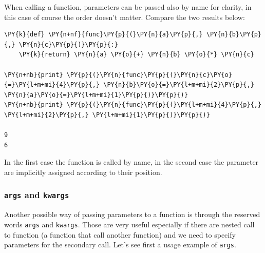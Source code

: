When calling a function, parameters can be passed also by name for clarity, in this case of 
course the order doesn't matter. Compare the two results below:

\begin{codebox}[breakable, size=fbox, boxrule=1pt, pad at break*=1mm,colback=cellbackground, colframe=cellborder]
\begin{Verbatim}[commandchars=\\\{\}]
\PY{k}{def} \PY{n+nf}{func}\PY{p}{(}\PY{n}{a}\PY{p}{,} \PY{n}{b}\PY{p}{,} \PY{n}{c}\PY{p}{)}\PY{p}{:}
    \PY{k}{return} \PY{n}{a} \PY{o}{+} \PY{n}{b} \PY{o}{*} \PY{n}{c}

\PY{n+nb}{print} \PY{p}{(}\PY{n}{func}\PY{p}{(}\PY{n}{c}\PY{o}{=}\PY{l+m+mi}{4}\PY{p}{,} \PY{n}{b}\PY{o}{=}\PY{l+m+mi}{2}\PY{p}{,} \PY{n}{a}\PY{o}{=}\PY{l+m+mi}{1}\PY{p}{)}\PY{p}{)}
\PY{n+nb}{print} \PY{p}{(}\PY{n}{func}\PY{p}{(}\PY{l+m+mi}{4}\PY{p}{,} \PY{l+m+mi}{2}\PY{p}{,} \PY{l+m+mi}{1}\PY{p}{)}\PY{p}{)}

9
6
\end{Verbatim}
\end{codebox}

In the first case the function is called by name, in the second case the parameter are implicitly assigned according to their position.

\subsubsection{\texttt{args} and \texttt{kwargs}}

Another possible way of passing parameters to a function is through the reserved words 
\texttt{args} and \texttt{kwargs}. Those are very useful especially if there are nested call 
to function (a function that call another function) and we need to specify parameters for the secondary call.
Let's see first a usage example of \texttt{args}.

